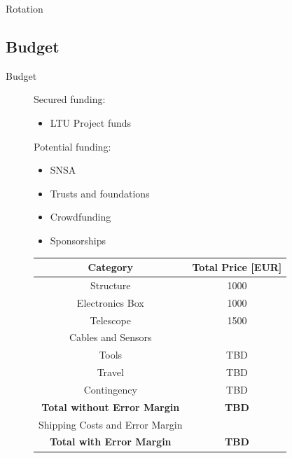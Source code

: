 \documentclass[11pt, aspectratio=169]{beamer}
\begin{document}
{\nologo
\begin{frame}[c]{Rotation}
\centering
\vspace{-.1cm}
\end{frame}}


\subsection{Budget} 			%
\begin{frame}{Budget}
\begin{figure}[!htb]
	\centering
    \begin{minipage}{0.3\textwidth}
	Secured funding:
	\begin{itemize}
		\item LTU Project funds
	\end{itemize}
	Potential funding:
	\begin{itemize}
		\item SNSA
		\item Trusts and foundations
		\item Crowdfunding
		\item Sponsorships
	\end{itemize}
	\end{minipage}%
	\begin{minipage}{0.7\textwidth}
	\centering
	\begin{table}[h]
		\begin{tabular}{|c|c|}
		\hline
		\textbf{Category} & \textbf{Total Price [EUR]} \\ 	\hline
		Structure & 1000 \\ \hline
		Electronics Box & 1000 \\ \hline
		Telescope & 1500 \\ \hline
		Cables and Sensors  &  \\ \hline
		Tools & TBD \\ \hline
		Travel & TBD \\ \hline
		Contingency & TBD  \\ \hline
		{\textbf{Total without Error Margin}} & \textbf{TBD} \\ \hline
		Shipping Costs and Error Margin  &  \\ \hline
		{\textbf{Total with Error Margin}} & \textbf{TBD} \\ \hline
		\end{tabular}
	\end{table}
	
	\end{minipage}
\end{figure}
\end{frame}
\end{document}
